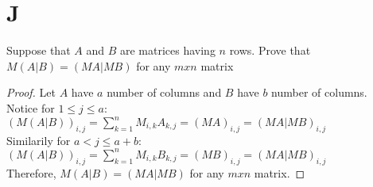 \documentclass[11pt]{scrartcl}
\begin{document}
\section{J}
Suppose that $A$ and $B$ are matrices having $n$ rows. Prove that $M(A|B) = (MA|MB)$ for any $mxn$ matrix
\begin{proof}
Let $A$ have $a$ number of columns and $B$ have $b$ number of columns. \\
Notice for $1 \leq j \leq a$:
$(M(A|B))_{i,j} = \sum_{k=1}^{n} M_{i,k}A_{k,j} = (MA)_{i,j} = (MA|MB)_{i,j}$\\
Similarily for $a < j \leq a + b$:
$(M(A|B))_{i,j} = \sum_{k=1}^{n} M_{i,k}B_{k,j} = (MB)_{i,j} = (MA|MB)_{i,j}$\\
Therefore, $M(A|B) = (MA|MB)$ for any $mxn$ matrix.
\end{proof}
\end{document}
